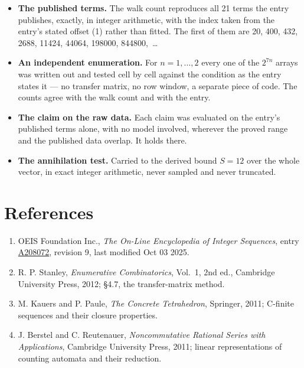 \documentclass[11pt]{article}
\theoremstyle{definition}
\begin{document}
\begin{itemize}

\item {\bfseries The published terms.} The walk count reproduces all 21 terms the entry publishes, exactly, in integer arithmetic, with the index taken from the entry's stated offset (1) rather than fitted. The first of them are 20, 400, 432, 2688, 11424, 44064, 198000, 844800,~\dots

\item {\bfseries An independent enumeration.} For $n = 1,\dots,2$ every one of the $2^{7n}$ arrays was written out and tested cell by cell against the condition as the entry states it --- no transfer matrix, no row window, a separate piece of code. The counts agree with the walk count and with the entry.

\item {\bfseries The claim on the raw data.} Each claim was evaluated on the entry's published terms alone, with no model involved, wherever the proved range and the published data overlap. It holds there.

\item {\bfseries The annihilation test.} Carried to the derived bound $S = 12$ over the whole vector, in exact integer arithmetic, never sampled and never truncated.

\end{itemize}

\section{References}

\begin{enumerate}

\item OEIS Foundation Inc., \emph{The On-Line Encyclopedia of Integer Sequences}, entry \href{https://oeis.org/A208072}{A208072}, revision 9, last modified Oct 03 2025.

\item R. P. Stanley, \emph{Enumerative Combinatorics}, Vol.~1, 2nd ed., Cambridge University Press, 2012; \S4.7, the transfer-matrix method.

\item M. Kauers and P. Paule, \emph{The Concrete Tetrahedron}, Springer, 2011; C-finite sequences and their closure properties.

\item J. Berstel and C. Reutenauer, \emph{Noncommutative Rational Series with Applications}, Cambridge University Press, 2011; linear representations of counting automata and their reduction.

\end{enumerate}
\end{document}
